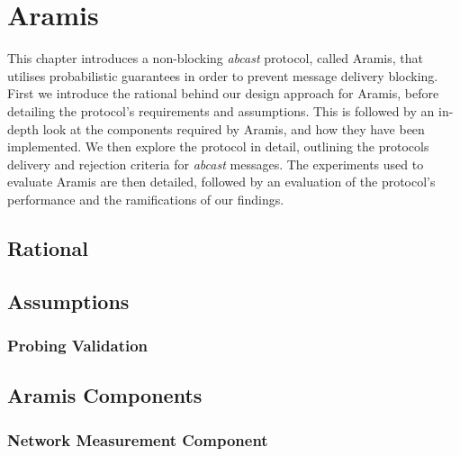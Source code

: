 \chapter{Aramis}

    \graphicspath{{Chapter4/Figs/Vector/}{Chapter4/Figs/}}

This chapter introduces a non-blocking \emph{abcast} protocol, called \textsf{Aramis}, that utilises probabilistic guarantees in order to prevent message delivery blocking.  First we introduce the rational behind our design approach for \textsf{Aramis}, before detailing the protocol's requirements and assumptions.  This is followed by an in-depth look at the components required by \textsf{Aramis}, and how they have been implemented.  We then explore the protocol in detail, outlining the protocols delivery and rejection criteria for \emph{abcast} messages.  The experiments used to evaluate \textsf{Aramis} are then detailed, followed by an evaluation of the protocol's performance and the ramifications of our findings.  

\section{Rational}
	
\section{Assumptions}

	\subsection{Probing Validation}
	
\section{Aramis Components}
	\subsection{Network Measurement Component}
